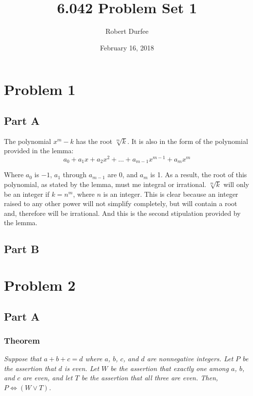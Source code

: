 \documentclass{article}
\title{ 6.042 Problem Set 1 }
\author{ Robert Durfee }
\date{ February 16, 2018 }
\begin{document}
\maketitle

\section*{Problem 1 }

\subsection*{Part A}

The polynomial $ x^{m} - k $ has the root $\sqrt[m]{k}$. It is also in the form
of the polynomial provided in the lemma:
$$ a_{0} + a_{1}x + a_{2}x^{2} + \ldots + a_{m-1}x^{m-1} + a_{m}x^{m} $$

Where $a_{0}$ is $-1$, $a_{1}$ through $a_{m-1}$ are 0, and $a_{m}$ is 1. As a
result, the root of this polynomial, as stated by the lemma, must me integral or
irrational. $\sqrt[m]{k}$ will only be an integer if $k = n^{m}$, where $n$ is
an integer. This is clear because an integer raised to any other power will not
simplify completely, but will contain a root and, therefore will be irrational.
And this is the second stipulation provided by the lemma.

\subsection*{Part B}

\section*{Problem 2}

\subsection*{Part A}

\subsubsection*{Theorem}

\textit{Suppose that $a + b + c = d$ where $a$, $b$, $c$, and $d$ are nonnegative
integers. Let $P$ be the assertion that $d$ is even. Let $W$ be the assertion
that exactly one among $a$, $b$, and $c$ are even, and let $T$ be the assertion
that all three are even. Then, $ P \iff (W \lor T) $.}
\end{document}
